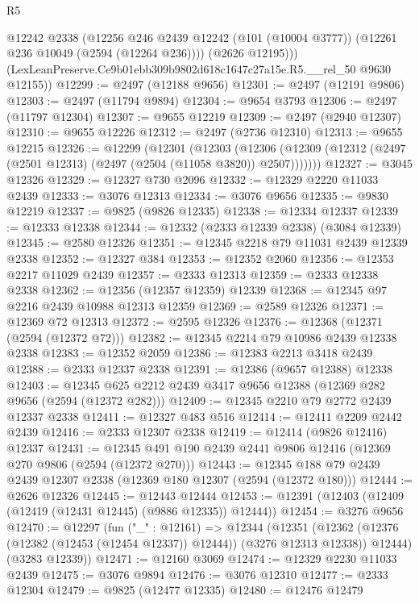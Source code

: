 \begin{lexlean}{R5}
\begin{coremodule}
          @12242
          @2338
          (@12256
            @246
            @2439
            @12242
            (@101 (@10004 @3777))
            (@12261 @236 @10049 (@2594 (@12264 @236))))
          (@2626 @12195)))
      (LexLeanPreserve.Ce9b01ebb309b9802d618c1647c27a15e.R5.__rel_50 @9630 @12155))
@12299 := @2497 (@12188 @9656)
@12301 := @2497 (@12191 @9806)
@12303 := @2497 (@11794 @9894)
@12304 := @9654 @3793
@12306 := @2497 (@11797 @12304)
@12307 := @9655 @12219
@12309 := @2497 (@2940 @12307)
@12310 := @9655 @12226
@12312 := @2497 (@2736 @12310)
@12313 := @9655 @12215
@12326 := @12299
    (@12301
      (@12303
        (@12306 (@12309 (@12312 (@2497 (@2501 @12313) (@2497 (@2504 (@11058 @3820)) @2507)))))))
@12327 := @3045 @12326
@12329 := @12327 @730 @2096
@12332 := @12329 @2220 @11033 @2439
@12333 := @3076 @12313
@12334 := @3076 @9656
@12335 := @9830 @12219
@12337 := @9825 (@9826 @12335)
@12338 := @12334 @12337
@12339 := @12333 @12338
@12344 := @12332 (@2333 @12339 @2338) (@3084 @12339)
@12345 := @2580 @12326
@12351 := @12345 @2218 @79 @11031 @2439 @12339 @2338
@12352 := @12327 @384
@12353 := @12352 @2060
@12356 := @12353 @2217 @11029 @2439
@12357 := @2333 @12313
@12359 := @2333 @12338 @2338
@12362 := @12356 (@12357 @12359) @12339
@12368 := @12345 @97 @2216 @2439 @10988 @12313 @12359
@12369 := @2589 @12326
@12371 := @12369 @72 @12313
@12372 := @2595 @12326
@12376 := @12368 (@12371 (@2594 (@12372 @72)))
@12382 := @12345 @2214 @79 @10986 @2439 @12338 @2338
@12383 := @12352 @2059
@12386 := @12383 @2213 @3418 @2439
@12388 := @2333 @12337 @2338
@12391 := @12386 (@9657 @12388) @12338
@12403 := @12345 @625 @2212 @2439 @3417 @9656 @12388 (@12369 @282 @9656 (@2594 (@12372 @282)))
@12409 := @12345 @2210 @79 @2772 @2439 @12337 @2338
@12411 := @12327 @483 @516
@12414 := @12411 @2209 @2442 @2439
@12416 := @2333 @12307 @2338
@12419 := @12414 (@9826 @12416) @12337
@12431 := @12345 @491 @190 @2439 @2441 @9806 @12416 (@12369 @270 @9806 (@2594 (@12372 @270)))
@12443 := @12345 @188 @79 @2439 @2439 @12307 @2338 (@12369 @180 @12307 (@2594 (@12372 @180)))
@12444 := @2626 @12326
@12445 := @12443 @12444
@12453 := @12391 (@12403 (@12409 (@12419 (@12431 @12445) (@9886 @12335)) @12444))
@12454 := @3276 @9656
@12470 := @12297
    (fun ("_" : @12161) =>
    @12344
      (@12351
        (@12362 (@12376 (@12382 (@12453 (@12454 @12337)) @12444)) (@3276 @12313 @12338))
        @12444)
      (@3283 @12339))
@12471 := @12160 @3069
@12474 := @12329 @2230 @11033 @2439
@12475 := @3076 @9894
@12476 := @3076 @12310
@12477 := @2333 @12304
@12479 := @9825 (@12477 @12335)
@12480 := @12476 @12479

\end{coremodule}
\end{lexlean}
